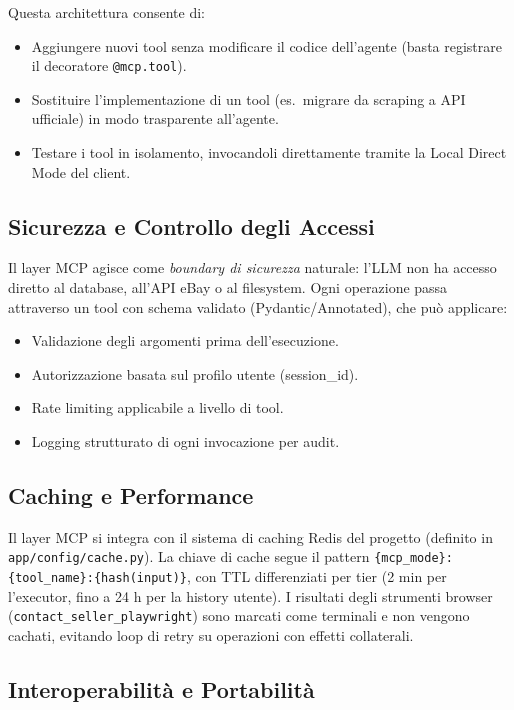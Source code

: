 Questa architettura consente di:
\begin{itemize}
    \item Aggiungere nuovi tool senza modificare il codice dell'agente
        (basta registrare il decoratore \texttt{@mcp.tool}).
    \item Sostituire l'implementazione di un tool (es.\ migrare da
        scraping a API ufficiale) in modo trasparente all'agente.
    \item Testare i tool in isolamento, invocandoli direttamente
        tramite la Local Direct Mode del client.
\end{itemize}

\subsection{Sicurezza e Controllo degli Accessi}
\label{subsec:mcp-security}

Il layer MCP agisce come \emph{boundary di sicurezza} naturale:
l'LLM non ha accesso diretto al database, all'API eBay o al
filesystem. Ogni operazione passa attraverso un tool con schema
validato (Pydantic/Annotated), che può applicare:

\begin{itemize}
    \item Validazione degli argomenti prima dell'esecuzione.
    \item Autorizzazione basata sul profilo utente (session\_id).
    \item Rate limiting applicabile a livello di tool.
    \item Logging strutturato di ogni invocazione per audit.
\end{itemize}

\subsection{Caching e Performance}
\label{subsec:mcp-caching}

Il layer MCP si integra con il sistema di caching Redis del progetto
(definito in \texttt{app/config/cache.py}). La chiave di cache segue
il pattern \texttt{\{mcp\_mode\}:\{tool\_name\}:\{hash(input)\}},
con TTL differenziati per tier (2 min per l'executor, fino a 24 h
per la history utente). I risultati degli strumenti browser
(\texttt{contact\_seller\_playwright}) sono marcati come terminali
e non vengono cachati, evitando loop di retry su operazioni
con effetti collaterali.

\subsection{Interoperabilità e Portabilità}
\label{subsec:mcp-interop}

